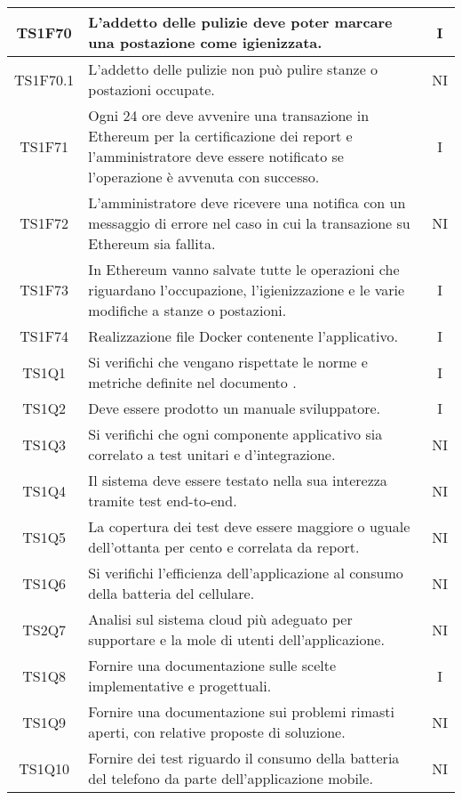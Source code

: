 \begin{center}
\begin{longtable}{|c|p{10cm}|c|}
			\hline
			TS1F70 & L'addetto delle pulizie deve poter marcare una postazione come igienizzata. & I \\	
			\hline
			TS1F70.1 & L'addetto delle pulizie non può pulire stanze o postazioni occupate. & NI \\	
			\hline
			TS1F71 & Ogni 24 ore deve avvenire una transazione in Ethereum per la certificazione dei report e l'amministratore deve essere notificato se l'operazione è avvenuta con successo. & I \\	
			\hline			
			TS1F72 & L’amministratore deve ricevere una notifica con un messaggio di errore nel caso in cui la transazione su Ethereum sia fallita. & NI \\	
			\hline						
			TS1F73& In Ethereum vanno salvate tutte le operazioni che riguardano l'occupazione, l'igienizzazione e le varie modifiche a stanze o postazioni. & I \\	
			\hline
			TS1F74 & Realizzazione file Docker contenente l'applicativo. & I \\	
			\hline
			TS1Q1 & Si verifichi che vengano rispettate le norme e metriche definite nel documento \dext{Piano di qualifica v. 2.0.0}. & I \\	
			\hline			
			TS1Q2 & Deve essere prodotto un manuale sviluppatore. & I \\	
			\hline	
			TS1Q3 & Si verifichi che ogni componente applicativo sia correlato a test unitari e d'integrazione. & NI \\	
			\hline
			TS1Q4 & Il sistema deve essere testato nella sua interezza tramite test end-to-end. & NI \\	
			\hline
			TS1Q5 & La copertura dei test deve essere maggiore o uguale dell'ottanta per cento e correlata da report. & NI \\	
			\hline
			TS1Q6 & Si verifichi l'efficienza dell'applicazione al consumo della batteria del cellulare. & NI \\	
			\hline
			TS2Q7 & Analisi sul sistema cloud più adeguato per supportare e la mole di utenti dell'applicazione. & NI \\	
			\hline
			TS1Q8 & Fornire una documentazione sulle scelte implementative e progettuali. & I \\	
			\hline
			TS1Q9 & Fornire una documentazione sui problemi rimasti aperti, con relative proposte di soluzione. & NI \\	
			\hline
			TS1Q10 & Fornire dei test riguardo il consumo della batteria del telefono da parte dell'applicazione mobile. & NI \\	

\end{longtable}
\end{center}
